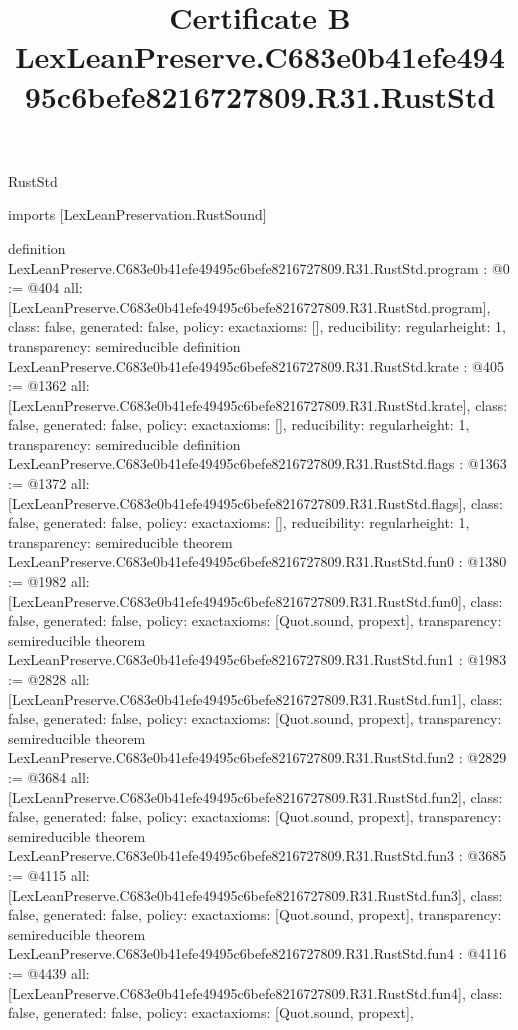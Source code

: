 \begin{lexlean}{RustStd}
\title{Certificate B LexLeanPreserve.C683e0b41efe49495c6befe8216727809.R31.RustStd}
\begin{coremodule}
imports [LexLeanPreservation.RustSound]

definition LexLeanPreserve.C683e0b41efe49495c6befe8216727809.R31.RustStd.program : @0 := @404 {
  all: [LexLeanPreserve.C683e0b41efe49495c6befe8216727809.R31.RustStd.program],
  class: false,
  generated: false,
  policy: exact{axioms: []},
  reducibility: regular{height: 1},
  transparency: semireducible
}
definition LexLeanPreserve.C683e0b41efe49495c6befe8216727809.R31.RustStd.krate : @405 := @1362 {
  all: [LexLeanPreserve.C683e0b41efe49495c6befe8216727809.R31.RustStd.krate],
  class: false,
  generated: false,
  policy: exact{axioms: []},
  reducibility: regular{height: 1},
  transparency: semireducible
}
definition LexLeanPreserve.C683e0b41efe49495c6befe8216727809.R31.RustStd.flags : @1363 := @1372 {
  all: [LexLeanPreserve.C683e0b41efe49495c6befe8216727809.R31.RustStd.flags],
  class: false,
  generated: false,
  policy: exact{axioms: []},
  reducibility: regular{height: 1},
  transparency: semireducible
}
theorem LexLeanPreserve.C683e0b41efe49495c6befe8216727809.R31.RustStd.fun0 : @1380 := @1982 {
  all: [LexLeanPreserve.C683e0b41efe49495c6befe8216727809.R31.RustStd.fun0],
  class: false,
  generated: false,
  policy: exact{axioms: [Quot.sound, propext]},
  transparency: semireducible
}
theorem LexLeanPreserve.C683e0b41efe49495c6befe8216727809.R31.RustStd.fun1 : @1983 := @2828 {
  all: [LexLeanPreserve.C683e0b41efe49495c6befe8216727809.R31.RustStd.fun1],
  class: false,
  generated: false,
  policy: exact{axioms: [Quot.sound, propext]},
  transparency: semireducible
}
theorem LexLeanPreserve.C683e0b41efe49495c6befe8216727809.R31.RustStd.fun2 : @2829 := @3684 {
  all: [LexLeanPreserve.C683e0b41efe49495c6befe8216727809.R31.RustStd.fun2],
  class: false,
  generated: false,
  policy: exact{axioms: [Quot.sound, propext]},
  transparency: semireducible
}
theorem LexLeanPreserve.C683e0b41efe49495c6befe8216727809.R31.RustStd.fun3 : @3685 := @4115 {
  all: [LexLeanPreserve.C683e0b41efe49495c6befe8216727809.R31.RustStd.fun3],
  class: false,
  generated: false,
  policy: exact{axioms: [Quot.sound, propext]},
  transparency: semireducible
}
theorem LexLeanPreserve.C683e0b41efe49495c6befe8216727809.R31.RustStd.fun4 : @4116 := @4439 {
  all: [LexLeanPreserve.C683e0b41efe49495c6befe8216727809.R31.RustStd.fun4],
  class: false,
  generated: false,
  policy: exact{axioms: [Quot.sound, propext]},
}
\end{coremodule}
\end{lexlean}
